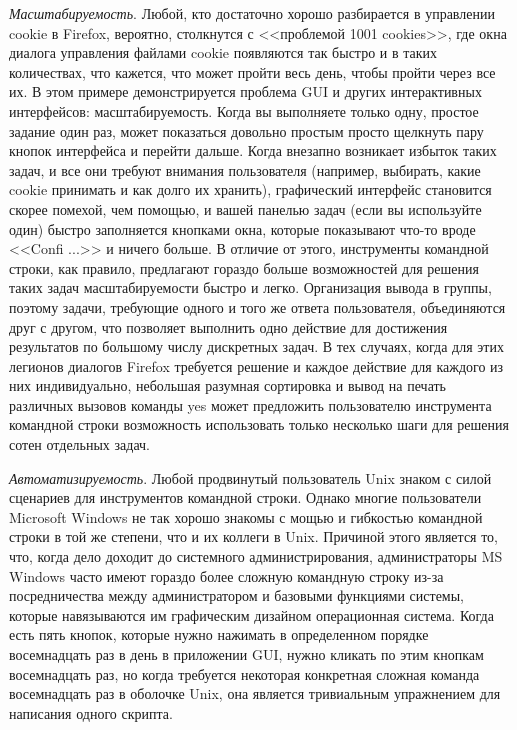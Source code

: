 \textit{Масштабируемость}. Любой, кто достаточно хорошо разбирается в управлении cookie в Firefox, вероятно, столкнутся с <<проблемой 1001 cookies>>, где окна диалога управления файлами cookie появляются так быстро и в таких количествах, что кажется, что может пройти весь день, чтобы пройти через все их. В этом примере демонстрируется проблема GUI и других интерактивных интерфейсов: масштабируемость. Когда вы выполняете только одну, простое задание один раз, может показаться довольно простым просто щелкнуть пару кнопок интерфейса и перейти дальше. Когда внезапно возникает избыток таких задач, и все они требуют внимания пользователя (например, выбирать, какие cookie принимать и как долго их хранить), графический интерфейс становится скорее помехой, чем помощью, и вашей панелью задач (если вы используйте один) быстро заполняется кнопками окна, которые показывают что-то вроде <<Confi ...>> и ничего больше. В отличие от этого, инструменты командной строки, как правило, предлагают гораздо больше возможностей для решения таких задач масштабируемости быстро и легко. Организация вывода в группы, поэтому задачи, требующие одного и того же ответа пользователя, объединяются друг с другом, что позволяет выполнить одно действие для достижения результатов по большому числу дискретных задач. В тех случаях, когда для этих легионов диалогов Firefox требуется решение и каждое действие для каждого из них индивидуально, небольшая разумная сортировка и вывод на печать различных вызовов команды yes может предложить пользователю инструмента командной строки возможность использовать только несколько шаги для решения сотен отдельных задач.

\textit{Автоматизируемость}. Любой продвинутый пользователь Unix знаком с силой сценариев для инструментов командной строки. Однако многие пользователи Microsoft Windows не так хорошо знакомы с мощью и гибкостью командной строки в той же степени, что и их коллеги в Unix. Причиной этого является то, что, когда дело доходит до системного администрирования, администраторы MS Windows часто имеют гораздо более сложную командную строку из-за посредничества между администратором и базовыми функциями системы, которые навязываются им графическим дизайном операционная система. Когда есть пять кнопок, которые нужно нажимать в определенном порядке восемнадцать раз в день в приложении GUI, нужно кликать по этим кнопкам восемнадцать раз, но когда требуется некоторая конкретная сложная команда восемнадцать раз в оболочке Unix, она является тривиальным упражнением для написания одного скрипта.

